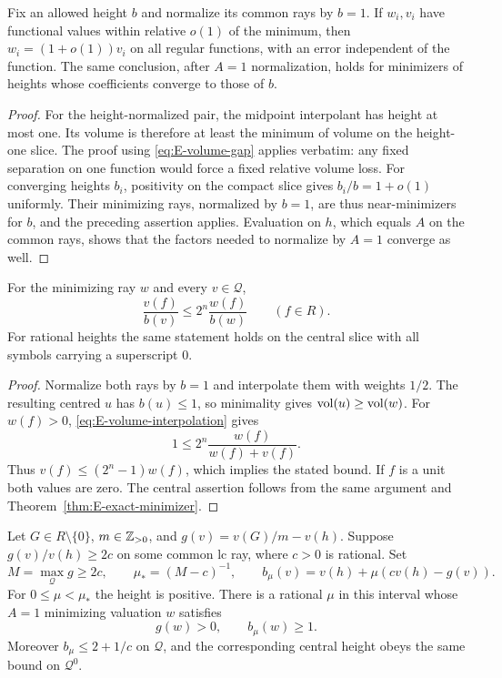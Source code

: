 \begin{corollary}\label{cor:E-height-near-minimizers}
Fix an allowed height $b$ and normalize its common rays by $b=1$.
If $w_i,v_i$ have functional values within relative $o(1)$ of the
minimum, then $w_i=(1+o(1))v_i$ on all regular functions, with an error
independent of the function. The same conclusion, after $A=1$
normalization, holds for minimizers of heights whose coefficients
converge to those of $b$.
\end{corollary}
\begin{proof}
For the height-normalized pair, the midpoint interpolant has height
at most one. Its volume is therefore at least the minimum of volume
on the height-one slice. The proof using
\eqref{eq:E-volume-gap} applies verbatim: any fixed separation on one
function would force a fixed relative volume loss. For converging
heights $b_i$, positivity on the compact slice gives
$b_i/b=1+o(1)$ uniformly. Their minimizing rays, normalized by $b=1$,
are thus near-minimizers for $b$, and the preceding assertion applies.
Evaluation on $h$, which equals $A$ on the common rays, shows that
the factors needed to normalize by $A=1$ converge as well.
\end{proof}

\begin{corollary}\label{cor:E-domination}
For the minimizing ray $w$ and every $v\in\mathcal Q$,
\begin{equation}\label{eq:E-domination}
 \frac{v(f)}{b(v)}\le 2^n\frac{w(f)}{b(w)}
                 \qquad(f\in R).
\end{equation}
For rational heights the same statement holds on the central slice
with all symbols carrying a superscript $0$.
\end{corollary}
\begin{proof}
Normalize both rays by $b=1$ and interpolate them with weights $1/2$.
The resulting centred $u$ has $b(u)\le1$, so minimality gives
$\operatorname{vol}(u)\ge\operatorname{vol}(w)$. For $w(f)>0$,
\eqref{eq:E-volume-interpolation} gives
\[
 1\le2^n\frac{w(f)}{w(f)+v(f)}.
\]
Thus $v(f)\le(2^n-1)w(f)$, which implies the stated bound.
If $f$ is a unit both values are zero. The central assertion follows
from the same argument and Theorem~\ref{thm:E-exact-minimizer}.
\end{proof}

\begin{lemma}\label{lem:E-one-sided-tilt}
Let $G\in R\setminus\{0\}$, $m\in\mathbb Z_{>0}$, and
$g(v)=v(G)/m-v(h)$. Suppose $g(v)/v(h)\ge2c$ on some common lc ray,
where $c>0$ is rational. Set
\[
 M=\max_{\mathcal Q}g\ge2c,\qquad
 \mu_*=(M-c)^{-1},\qquad
 b_\mu(v)=v(h)+\mu(cv(h)-g(v)).
\]
For $0\le\mu<\mu_*$ the height is positive. There is a rational
$\mu$ in this interval whose $A=1$ minimizing valuation $w$ satisfies
\[
 g(w)>0,\qquad b_\mu(w)\ge1.
\]
Moreover $b_\mu\le2+1/c$ on $\mathcal Q$, and the corresponding
central height obeys the same bound on $\mathcal Q^0$.
\end{lemma}

